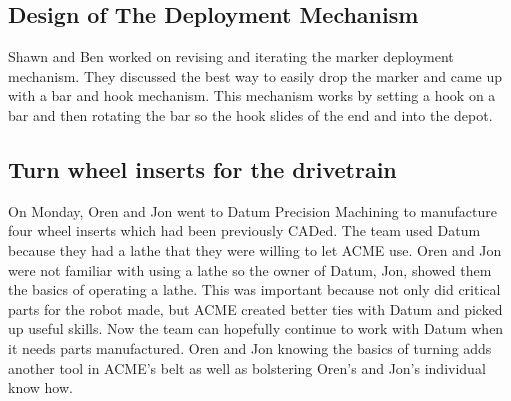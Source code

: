 \documentclass{article}
\newif\ifcontents
\begin{document}
\contentsfalse

\subsection{Design of The Deployment Mechanism}
Shawn and Ben worked on revising and iterating the marker deployment mechanism. They discussed the best way to easily drop the marker and came up with a bar and hook mechanism. This mechanism works by setting a hook on a bar and then rotating the bar so the hook slides of the end and into the depot.

\subsection{Turn wheel inserts for the drivetrain}
On Monday, Oren and Jon went to Datum Precision Machining to manufacture four wheel inserts which had been previously CADed. The team used Datum because they had a lathe that they were willing to let ACME use. Oren and Jon were not familiar with using a lathe so the owner of Datum, Jon, showed them the basics of operating a lathe. This was important because not only did critical parts for the robot made, but ACME created better ties with Datum and picked up useful skills. Now the team can hopefully continue to work with Datum when it needs parts manufactured. Oren and Jon knowing the basics of turning adds another tool in ACME’s belt as well as bolstering Oren’s and Jon’s individual know how.
\end{document}
